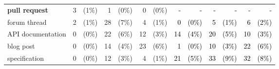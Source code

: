 \documentclass[smallextended]{svjour3}       %
\newcommand{\fix}[1]{\textcolor{black}{#1}}
\begin{document}
\begin{table}[t]
{\begin{tabular}{lr@{}rr@{}rr@{}r|r@{}rr@{}rr@{}r}
\textbf{pull request} & 3                             & (1\%)                             & 1                             & (0\%)                             & 0                             & (0\%)                             & \fix{ -}                             & \fix{ -}                                 & \fix{ -}                             & \fix{ -}                                 & \fix{ -}                             & \fix{ -}                                 \\
forum thread                           & 2                             & (1\%)                             & 28                            & (7\%)                             & 4                             & (1\%)                             & \fix{ 0}                             & \fix{ (0\%)}                             & \fix{ 5}                             & \fix{ (1\%)}                             & \fix{ 6}                             & \fix{ (2\%)}                             \\
API documentation                      & 0                             & (0\%)                             & 22                            & (6\%)                             & 12                            & (3\%)                             & \fix{ 14}                            & \fix{ (4\%)}                             & \fix{ 20}                            & \fix{ (5\%)}                             & \fix{ 10}                            & \fix{ (3\%)}                             \\
blog post                              & 0                             & (0\%)                             & 14                            & (4\%)                             & 23                            & (6\%)                             & \fix{ 1}                             & \fix{ (0\%)}                             & \fix{ 10}                            & \fix{ (3\%)}                             & \fix{ 22}                            & \fix{ (6\%)}                             \\
specification                          & 0                             & (0\%)                             & 12                            & (3\%)                             & 4                             & (1\%)                             & \fix{ 21}                            & \fix{ (5\%)}                             & \fix{ 33}                            & \fix{ (9\%)}                             & \fix{ 32}                            & \fix{ (8\%)}                             \\

\end{tabular}}
\end{table}
\end{document}
